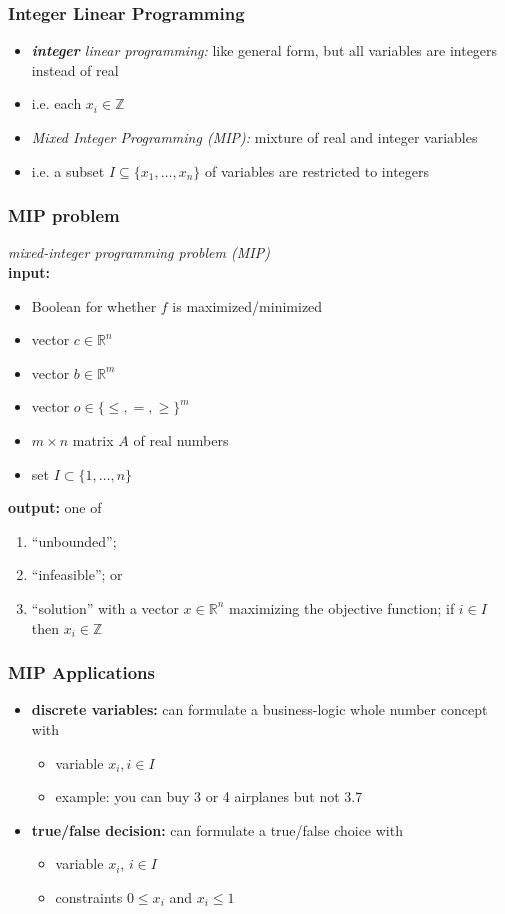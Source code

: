 \documentclass[10pt,aspectratio=169]{beamer}
\begin{document}
\begin{frame} \frametitle{Integer Linear Programming}
  \begin{itemize}
  \item \emph{\textbf{integer} linear programming:} like general form, but all variables are integers instead of real
  \item i.e. each $x_i \in \mathbb{Z}$
  \item \emph{Mixed Integer Programming (MIP):} mixture of real and integer variables
  \item i.e. a subset $I \subseteq \{x_1, \ldots, x_n\}$ of variables are restricted to integers
  \end{itemize}
\end{frame}

\begin{frame} \frametitle{MIP problem}
  \emph{mixed-integer programming problem (MIP)} \\
  \textbf{input:}
  \begin{itemize}
    \item Boolean for whether $f$ is maximized/minimized
    \item vector $c \in \mathbb{R}^n$
    \item vector $b \in \mathbb{R}^m$
    \item vector $o \in \{\leq, =, \geq\}^m$
    \item $m \times n$ matrix $A$ of real numbers
    \item set $I \subset \{1, \ldots, n\}$
  \end{itemize}
  \textbf{output:} one of
  \begin{enumerate}
    \item ``unbounded'';
    \item ``infeasible''; or
    \item ``solution'' with a vector $x \in \mathbb{R}^n$
      maximizing the objective function; if $i \in I$ then $x_i \in \mathbb{Z}$
  \end{enumerate}
\end{frame}

\begin{frame} \frametitle{MIP Applications}
  \begin{itemize}
  \item \textbf{discrete variables:} can formulate a business-logic whole number concept with
  \begin{itemize}
    \item variable $x_i, i \in I$
    \item example: you can buy 3 or 4 airplanes but not 3.7
  \end{itemize}
  \item \textbf{true/false decision:} can formulate a true/false choice with
    \begin{itemize}
    \item variable $x_i$, $i \in I$
    \item constraints $0 \leq x_i$ and $x_i \leq 1$
    \end{itemize}
\end{itemize}
\end{frame}
\end{document}
